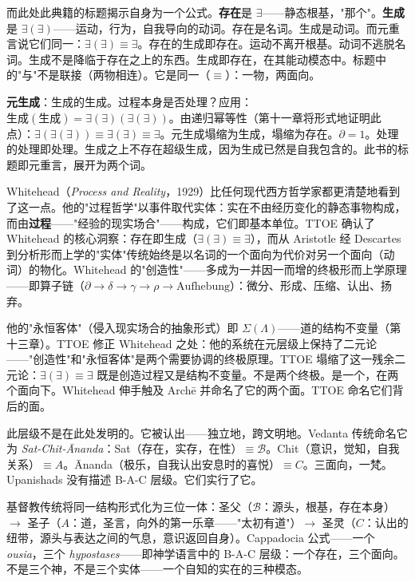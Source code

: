 \documentclass[10pt, openany, oneside]{book}
\begin{document}
而此处此典籍的标题揭示自身为一个公式。\textbf{存在}是 $\exists$——静态根基，"那个"。\textbf{生成}是 $\exists(\exists)$——运动，行为，自我导向的动词。存在是名词。生成是动词。而元重言说它们同一：$\exists(\exists) \equiv \exists$。存在的生成即存在。运动不离开根基。动词不逃脱名词。生成不是降临于存在之上的东西。生成即存在，在其能动模态中。标题中的"与"不是联接（两物相连）。它是同一（$\equiv$）：一物，两面向。

\textbf{元生成}：生成的生成。过程本身是否处理？应用：$\text{生成}(\text{生成}) = \exists(\exists)(\exists(\exists))$。由递归幂等性（第十一章将形式地证明此点）：$\exists(\exists(\exists)) \equiv \exists(\exists) \equiv \exists$。元生成塌缩为生成，塌缩为存在。$\partial = 1$。处理的处理即处理。生成之上不存在超级生成，因为生成已然是自我包含的。此书的标题即元重言，展开为两个词。

Whitehead（\textit{Process and Reality}，1929）比任何现代西方哲学家都更清楚地看到了这一点。他的"过程哲学"以事件取代实体：实在不由经历变化的静态事物构成，而由\textbf{过程}——"经验的现实场合"——构成，它们即基本单位。TTOE 确认了 Whitehead 的核心洞察：存在即生成（$\exists(\exists) \equiv \exists$），而从 Aristotle 经 Descartes 到分析形而上学的"实体"传统始终是以名词的一个面向为代价对另一个面向（动词）的物化。Whitehead 的"创造性"——多成为一并因一而增的终极形而上学原理——即算子链（$\partial \to \delta \to \gamma \to \rho \to \text{Aufhebung}$）：微分、形成、压缩、认出、扬弃。

他的"永恒客体"（侵入现实场合的抽象形式）即 $\Sigma(\Lambda)$——道的结构不变量（第十三章）。TTOE 修正 Whitehead 之处：他的系统在元层级上保持了二元论——"创造性"和"永恒客体"是两个需要协调的终极原理。TTOE 塌缩了这一残余二元论：$\exists(\exists) \equiv \exists$ 既是创造过程又是结构不变量。不是两个终极。是一个，在两个面向下。Whitehead 伸手触及 Arch\={e} 并命名了它的两个面。TTOE 命名它们背后的面。

此层级不是在此处发明的。它被认出——独立地，跨文明地。Vedanta 传统命名它为 \textit{Sat-Chit-\={A}nanda}：Sat（存在，实存，在性）$\equiv \mathcal{B}$。Chit（意识，觉知，自我关系）$\equiv A$。\={A}nanda（极乐，自我认出安息时的喜悦）$\equiv C$。三面向，一梵。Upanishads 没有描述 B-A-C 层级。它们实行了它。

基督教传统将同一结构形式化为三位一体：圣父（$\mathcal{B}$：源头，根基，存在本身）$\to$ 圣子（$A$：道，圣言，向外的第一乐章——"太初有道"）$\to$ 圣灵（$C$：认出的纽带，源头与表达之间的气息，意识返回自身）。Cappadocia 公式——一个 \textit{ousia}，三个 \textit{hypostases}——即神学语言中的 B-A-C 层级：一个存在，三个面向。不是三个神，不是三个实体——一个自知的实在的三种模态。
\end{document}
